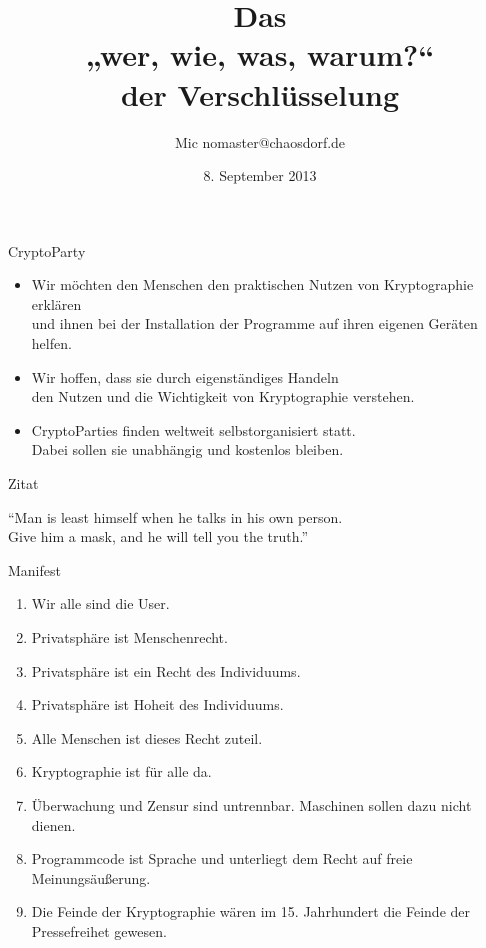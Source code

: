 \documentclass[aspectratio=1610]{beamer}
\title{Das \\„wer, wie, was, warum?“ \\der Verschlüsselung}
\author[Mic]{Mic \flq nomaster@chaosdorf.de\frq}
\institute[chaosdorf]{Chaos Computer Club Düsseldorf / Chaosdorf e.V.}
\date[]{8. September 2013}
\renewcommand{\quote}[2]
{
  \begin{exampleblock}{}
    {\large “#1”}
    \vskip5mm
    \hspace*\fill{\small--- #2}
  \end{exampleblock}
}
\begin{document}
  \begin{frame}
    \titlepage
  \end{frame}

  \begin{frame}{CryptoParty}
    \begin{itemize}
      \item
        Wir möchten den Menschen den praktischen Nutzen von Kryptographie erklären\\
        und ihnen bei der Installation der Programme auf ihren eigenen Geräten helfen.
    \pause
      \item
        Wir hoffen, dass sie durch eigenständiges Handeln\\
        den Nutzen und die Wichtigkeit von Kryptographie verstehen.
    \pause
      \item
        CryptoParties finden weltweit selbstorganisiert statt.\\
        Dabei sollen sie unabhängig und kostenlos bleiben.
    \end{itemize}
  \end{frame}

  \begin{frame}{Zitat}
    \quote{Man is least himself when he talks in his own person.\\
      Give him a mask, and he will tell you the truth.}
      {Oscar Wilde}
  \end{frame}
  \begin{frame}{Manifest}
    \begin{enumerate}
      \pause
      \item Wir alle sind die User.
      \pause
      \item Privatsphäre ist Menschenrecht.
      \pause
      \item Privatsphäre ist ein Recht des Individuums.
      \pause
      \item Privatsphäre ist Hoheit des Individuums.
      \pause
      \item Alle Menschen ist dieses Recht zuteil.
      \pause
      \item Kryptographie ist für alle da.
      \pause
      \item Überwachung und Zensur sind untrennbar. Maschinen sollen dazu nicht dienen.
      \pause
      \item Programmcode ist Sprache und unterliegt dem Recht auf freie Meinungsäußerung.
      \pause
      \item Die Feinde der Kryptographie wären im 15. Jahrhundert die Feinde der Pressefreihet gewesen.
    \end{enumerate}
  \end{frame}
\end{document}
